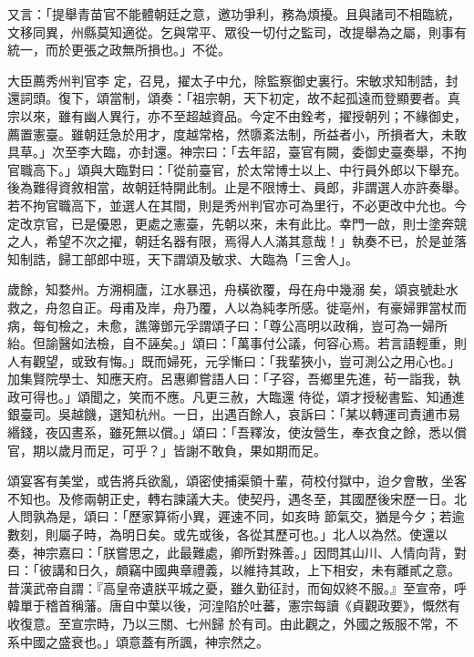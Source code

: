 \begin{pinyinscope}
 又言：「提舉青苗官不能體朝廷之意，邀功爭利，務為煩擾。且與諸司不相臨統，文移同異，州縣莫知適從。乞與常平、眾役一切付之監司，改提舉為之屬，則事有統一，而於更張之政無所損也。」不從。



 大臣薦秀州判官李
 定，召見，擢太子中允，除監察御史裏行。宋敏求知制誥，封還詞頭。復下，頌當制，頌奏：「祖宗朝，天下初定，故不起孤遠而登顯要者。真宗以來，雖有幽人異行，亦不至超越資品。今定不由銓考，擢授朝列；不緣御史，薦置憲臺。雖朝廷急於用才，度越常格，然隳紊法制，所益者小，所損者大，未敢具草。」次至李大臨，亦封還。神宗曰：「去年詔，臺官有闕，委御史臺奏舉，不拘官職高下。」頌與大臨對曰：「從前臺官，於太常博士以上、中行員外郎以下舉充。
 後為難得資敘相當，故朝廷特開此制。止是不限博士、員郎，非謂選人亦許奏舉。若不拘官職高下，並選人在其間，則是秀州判官亦可為里行，不必更改中允也。今定改京官，已是優恩，更處之憲臺，先朝以來，未有此比。幸門一啟，則士塗奔競之人，希望不次之擢，朝廷名器有限，焉得人人滿其意哉！」執奏不已，於是並落知制誥，歸工部郎中班，天下謂頌及敏求、大臨為「三舍人」。



 歲餘，知婺州。方溯桐廬，江水暴迅，舟橫欲覆，母在舟中幾溺
 矣，頌哀號赴水救之，舟忽自正。母甫及岸，舟乃覆，人以為純孝所感。徙亳州，有豪婦罪當杖而病，每旬檢之，未愈，譙簿鄧元孚謂頌子曰：「尊公高明以政稱，豈可為一婦所紿。但諭醫如法檢，自不誣矣。」頌曰：「萬事付公議，何容心焉。若言語輕重，則人有觀望，或致有悔。」既而婦死，元孚慚曰：「我輩狹小，豈可測公之用心也。」加集賢院學士、知應天府。呂惠卿嘗語人曰：「子容，吾鄉里先進，茍一詣我，執政可得也。」頌聞之，笑而不應。凡更三赦，大臨還
 侍從，頌才授秘書監、知通進銀臺司。吳越饑，選知杭州。一日，出遇百餘人，哀訴曰：「某以轉運司責逋市易緡錢，夜囚晝系，雖死無以償。」頌曰：「吾釋汝，使汝營生，奉衣食之餘，悉以償官，期以歲月而足，可乎？」皆謝不敢負，果如期而足。



 頌宴客有美堂，或告將兵欲亂，頌密使捕渠領十輩，荷校付獄中，迨夕會散，坐客不知也。及修兩朝正史，轉右諫議大夫。使契丹，遇冬至，其國歷後宋歷一日。北人問孰為是，頌曰：「歷家算術小異，遲速不同，如亥時
 節氣交，猶是今夕；若逾數刻，則屬子時，為明日矣。或先或後，各從其歷可也。」北人以為然。使還以奏，神宗嘉曰：「朕嘗思之，此最難處，卿所對殊善。」因問其山川、人情向背，對曰：「彼講和日久，頗竊中國典章禮義，以維持其政，上下相安，未有離貳之意。昔漢武帝自謂：『高皇帝遺朕平城之憂，雖久勤征討，而匈奴終不服。』至宣帝，呼韓單于稽首稱藩。唐自中葉以後，河湟陷於吐蕃，憲宗每讀《貞觀政要》，慨然有收復意。至宣宗時，乃以三關、七州歸
 於有司。由此觀之，外國之叛服不常，不系中國之盛衰也。」頌意蓋有所諷，神宗然之。




\end{pinyinscope}
